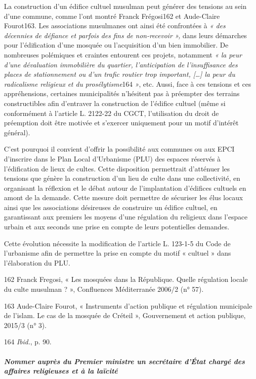 La construction d'un édifice cultuel musulman peut générer des tensions
au sein d'une commune, comme l'ont montré Franck Frégosi162 et
Aude-Claire Fourot163. Les associations musulmanes ont ainsi été
confrontées à \emph{« des décennies de défiance et parfois des fins de
non-recevoir »,} dans leurs démarches pour l'édification d'une mosquée
ou l'acquisition d'un bien immobilier. De nombreuses polémiques et
craintes entourent ces projets, notamment \emph{« la peur d'une
dévaluation immobilière du quartier, l'anticipation de l'insuffisance
des places de stationnement ou d'un trafic routier trop important,
{[}\ldots{]} la peur du radicalisme religieux et du prosélytisme}164
\emph{»}, etc. Aussi, face à ces tensions et ces appréhensions,
certaines municipalités n'hésitent pas à préempter des terrains
constructibles afin d'entraver la construction de l'édifice cultuel
(même si conformément à l'article L. 2122-22 du CGCT, l'utilisation du
droit de préemption doit être motivée et s'exercer uniquement pour un
motif d'intérêt général).

C'est pourquoi il convient d'offrir la possibilité aux communes ou aux
EPCI d'inscrire dans le Plan Local d'Urbanisme (PLU) des espaces
réservés à l'édification de lieux de cultes. Cette disposition
permettrait d'atténuer les tensions que génère la construction d'un lieu
de culte dans une collectivité, en organisant la réflexion et le débat
autour de l'implantation d'édifices cultuels en amont de la demande.
Cette mesure doit permettre de sécuriser les élus locaux ainsi que les
associations désireuses de construire un édifice cultuel, en
garantissant aux premiers les moyens d'une régulation du religieux dans
l'espace urbain et aux seconds une prise en compte de leurs potentielles
demandes.

Cette évolution nécessite la modification de l'article L. 123-1-5 du
Code de l'urbanisme afin de permettre la prise en compte du motif «
cultuel » dans l'élaboration du PLU.

162 Franck Fregosi, « Les mosquées dans la République. Quelle régulation
locale du culte musulman ? », Confluences Méditerranée 2006/2 (n° 57).

163 Aude-Claire Fourot, « Instruments d'action publique et régulation
municipale de l'islam. Le cas de la mosquée de Créteil », Gouvernement
et action publique, 2015/3 (n° 3).

164 \emph{Ibid.}, p. 90.




\hypertarget{nommer-aupruxe8s-du-premier-ministre-un-secruxe9taire-duxe9tat-charguxe9-des-affaires-religieuses-et-uxe0-la-lauxefcituxe9}{%
\subparagraph{Nommer auprès du Premier ministre un secrétaire d'État
chargé des affaires religieuses et à la
laïcité}\label{nommer-aupruxe8s-du-premier-ministre-un-secruxe9taire-duxe9tat-charguxe9-des-affaires-religieuses-et-uxe0-la-lauxefcituxe9}}


